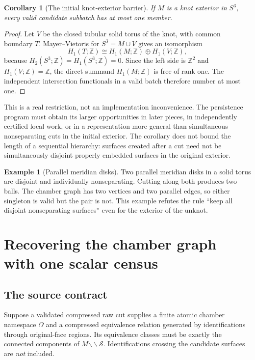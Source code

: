 \documentclass[11pt]{article}
\newtheorem{corollary}[theorem]{Corollary}
\theoremstyle{definition}
\newtheorem{example}[theorem]{Example}
\newcommand{\Z}{\mathbb Z}
\newcommand{\cut}{\mathbin{\backslash\!\backslash}}
\begin{document}
\begin{corollary}[The initial knot-exterior barrier]\label{cor:knot-barrier}
If $M$ is a knot exterior in $S^3$, every valid candidate subbatch has at most one member.
\end{corollary}
\begin{proof}
Let $V$ be the closed tubular solid torus of the knot, with common boundary $T$. Mayer--Vietoris for $S^3=M\cup V$ gives an isomorphism
\[
 H_1(T;\Z)\cong H_1(M;\Z)\oplus H_1(V;\Z),
\]
because $H_2(S^3;\Z)=H_1(S^3;\Z)=0$. Since the left side is $\Z^2$ and $H_1(V;\Z)=\Z$, the direct summand $H_1(M;\Z)$ is free of rank one. The independent intersection functionals in a valid batch therefore number at most one.
\end{proof}
This is a real restriction, not an implementation inconvenience. The persistence program must obtain its larger opportunities in later pieces, in independently certified local work, or in a representation more general than simultaneous nonseparating cuts in the initial exterior. The corollary does not bound the length of a sequential hierarchy: surfaces created after a cut need not be simultaneously disjoint properly embedded surfaces in the original exterior.

\begin{example}[Parallel meridian disks]\label{ex:meridians}
Two parallel meridian disks in a solid torus are disjoint and individually nonseparating. Cutting along both produces two balls. The chamber graph has two vertices and two parallel edges, so either singleton is valid but the pair is not. This example refutes the rule ``keep all disjoint nonseparating surfaces'' even for the exterior of the unknot.
\end{example}

\section{Recovering the chamber graph with one scalar census}\label{sec:census}
\subsection{The source contract}
Suppose a validated compressed raw cut supplies a finite atomic chamber namespace $\Omega$ and a compressed equivalence relation generated by identifications through original-face regions. Its equivalence classes must be exactly the connected components of $M\cut\mathcal S$. Identifications crossing the candidate surfaces are \emph{not} included.
\end{document}
